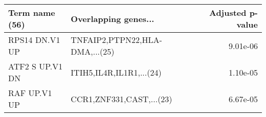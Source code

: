 \begin{tabular}{llr}
\toprule
 Term name (56) &           Overlapping genes... &  Adjusted p-value \\
\midrule
 RPS14 DN.V1 UP & TNFAIP2,PTPN22,HLA-DMA,...(25) &          9.01e-06 \\
ATF2 S UP.V1 DN &       ITIH5,IL4R,IL1R1,...(24) &          1.10e-05 \\
   RAF UP.V1 UP &       CCR1,ZNF331,CAST,...(23) &          6.67e-05 \\
\bottomrule
\end{tabular}
